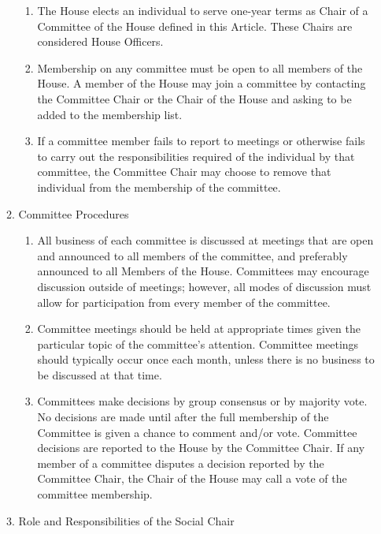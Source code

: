 \documentclass[letterpaper]{article}
\begin{document}
\begin{enumerate}
\begin{enumerate}
\begin{enumerate}
\item The House elects an individual to serve one-year terms as Chair of a Committee of the House defined in this Article. These Chairs are considered House Officers.

\item Membership on any committee must be open to all members of the House. A member of the House may join a committee by contacting the Committee Chair or the Chair of the House and asking to be added to the membership list.

\item If a committee member fails to report to meetings or otherwise fails to carry out the responsibilities required of the individual by that committee, the Committee Chair may choose to remove that individual from the membership of the committee.

\end{enumerate}

\item Committee Procedures 

\begin{enumerate}

\item All business of each committee is discussed at meetings that are open and announced to all members of the committee, and preferably announced to all Members of the House. Committees may encourage discussion outside of meetings; however, all modes of discussion must allow for participation from every member of the committee.

\item Committee meetings should be held at appropriate times given the particular topic of the committee's attention. Committee meetings should typically occur once each month, unless there is no business to be discussed at that time.

\item Committees make decisions by group consensus or by majority vote. No decisions are made until after the full membership of the Committee is given a chance to comment and/or vote. Committee decisions are reported to the House by the Committee Chair. If any member of a committee disputes a decision reported by the Committee Chair, the Chair of the House may call a vote of the committee membership.

\end{enumerate}

\item Role and Responsibilities of the Social Chair


\end{enumerate}
\end{enumerate}
\end{document}
